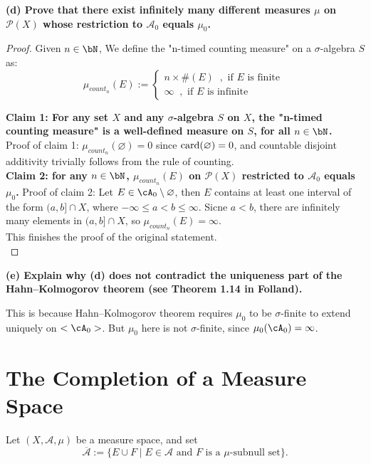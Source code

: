 \documentclass[lang=cn,11pt]{elegantbook}
\begin{document}
\noindent \textbf{(d) Prove that there exist infinitely many different measures \(\mu\) on \(\mathcal{P}(X)\) whose restriction to \(\mathcal{A}_0\) equals \(\mu_0\).}
\begin{proof}
    Given $n \in \bN$, We define the "n-timed counting measure" on a $\sigma$-algebra $S$ as:
$$
    \mu_{count_n}(E) := \begin{cases}
        n\times  \#(E) \;\;, \text{ if }  E \text{ is finite }  \\
        \infty \;\; ,\text{ if }  E \text{ is infinite }
    \end{cases}
 $$

 \noindent \textbf{Claim 1: For any set $X$ and any $\sigma$-algebra $S$ on $X$, the "n-timed counting measure" is a well-defined measure on $S$, for all $n \in \bN$.}\\
Proof of claim 1: $\mu_{count_n}(\varnothing) = 0$ since $\operatorname{card}(\varnothing)  =0$, and countable disjoint additivity trivially follows from the rule of counting.\\
\noindent \textbf{Claim 2: for any $n \in \bN$, $\mu_{count_n}(E) $ on \(\mathcal{P}(X)\) restricted to \(\mathcal{A}_0\) equals \(\mu_0\).}
Proof of claim 2: Let $E \in \cA_0 \setminus \varnothing$, then $E$ contains at least one interval of the form \((a, b] \cap X\), where \(-\infty \leq a < b \leq \infty\). Sicne $a < b$, there are infinitely many elements in \((a, b] \cap X\), so $\mu_{count_n}(E) = \infty$.\\
\noindent This finishes the proof of the original statement.\\
\end{proof}

\noindent \textbf{(e) Explain why (d) does not contradict the uniqueness part of the Hahn–Kolmogorov theorem (see Theorem 1.14 in Folland).}\\
\begin{solution}
    \noindent This is because Hahn–Kolmogorov theorem requires $\mu_0$ to be $\sigma$-finite to extend uniquely on $<\cA_0>$. But $\mu_0$ here is not $\sigma$-finite, since $\mu_0(\cA_0) = \infty$.\\
\end{solution}

\section{The Completion of a Measure Space}
Let \((X, \mathcal{A}, \mu)\) be a measure space, and set
\[
\overline{\mathcal{A}} := \{E \cup F \mid E \in \mathcal{A} \text{ and } F \text{ is a } \mu\text{-subnull set}\}.
\]
\end{document}
